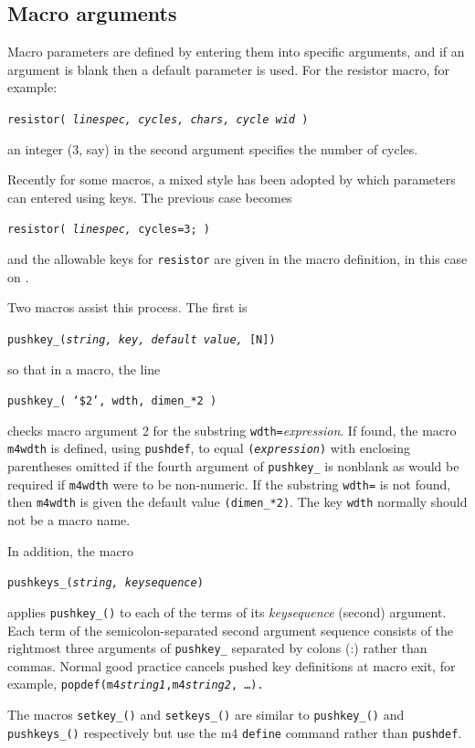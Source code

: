 \subsection{Macro arguments\label{Macroarguments:}}
Macro parameters are defined
by entering them into specific arguments, and if an argument is blank then
a default parameter is used.
For the resistor macro, for example:

{\tt resistor( {\sl linespec, cycles, chars, cycle wid} )}

\noindent
an integer (3, say) in the second argument specifies the number of cycles.

Recently for some macros, a mixed style has been adopted by which
parameters can entered using keys.  
The previous case becomes

{\tt resistor( {\sl linespec,} cycles=3; )}

\noindent
and the allowable keys for {\tt resistor} are given in the macro
definition, in this case on .

Two macros assist this process.
The first is

{\tt pushkey\_({\sl string, key, default value, }[N])}

\noindent
so that in a macro, the line

{\tt pushkey\_( `\$2', wdth, dimen\_*2 )}

\noindent
checks macro argument 2 for the substring {\tt wdth=}{\sl expression}.
If found, the macro {\tt m4wdth} is defined, using {\tt pushdef},
to equal {\tt ({\sl expression})} with enclosing
parentheses omitted if the fourth argument of {\tt pushkey\_} is
nonblank as would be required if {\tt m4wdth} were to be non-numeric.
If the substring {\tt wdth=} is not found, then
{\tt m4wdth} is given the default value {\tt (dimen\_*2)}.
The key {\tt wdth} normally should not be a macro name.

In addition, the macro

{\tt pushkeys\_({\sl string, keysequence})}

\noindent
applies {\tt pushkey\_()} to each of the terms of its {\sl keysequence}
(second) argument.
Each term of the semicolon-separated second argument sequence
consists of the rightmost three
arguments of {\tt pushkey\_} separated by colons (:) rather than commas.
Normal good practice cancels pushed key definitions at macro exit,
for example,
{\tt popdef(\LQ{}m4{}{\sl string1}\RQ,\LQ{}m4{}{\sl string2}\RQ, \ldots ).}

The macros {\tt setkey\_()} and {\tt setkeys\_()} are similar to
{\tt pushkey\_()} and {\tt pushkeys\_()} respectively but use the
m4 {\tt define} command rather than {\tt pushdef}.

